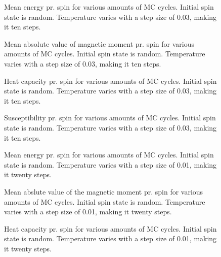 \documentclass{emulateapj}
\begin{document}
\begin{figure}[h]
\mbox{}
\caption{Mean energy pr. spin for various amounts of MC cycles. Initial spin state is random. Temperature varies with a step size of 0.03, making it ten steps.}
\label{fig:E-T2-23}
\end{figure}

\begin{figure}[h]
\mbox{}
\caption{Mean absolute value of magnetic moment pr. spin for various amounts of MC cycles. Initial spin state is random. Temperature varies with a step size of 0.03, making it ten steps.}
\label{fig:M-T2-23}
\end{figure}

\begin{figure}[h]
\mbox{}
\caption{Heat capacity pr. spin for various amounts of MC cycles. Initial spin state is random. Temperature varies with a step size of 0.03, making it ten steps.}
\label{fig:CV-T2-23}
\end{figure}

\begin{figure}[h]
\mbox{}
\caption{Susceptibility pr. spin for various amounts of MC cycles. Initial spin state is random. Temperature varies with a step size of 0.03, making it ten steps.}
\label{fig:chi-T2-23}
\end{figure}

\begin{figure}[h]
\mbox{}
\caption{Mean energy pr. spin for various amounts of MC cycles. Initial spin state is random. Temperature varies with a step size of 0.01, making it twenty steps.}
\label{fig:E-T22-23}
\end{figure}

\begin{figure}[h]
\mbox{}
\caption{Mean abslute value of the magnetic moment pr. spin for various amounts of MC cycles. Initial spin state is random. Temperature varies with a step size of 0.01, making it twenty steps.}
\label{fig:M-T22-23}
\end{figure}

\begin{figure}[h]
\mbox{}
\caption{Heat capacity pr. spin for various amounts of MC cycles. Initial spin state is random. Temperature varies with a step size of 0.01, making it twenty steps.}
\label{fig:CV-T22-24}
\end{figure}
\end{document}
